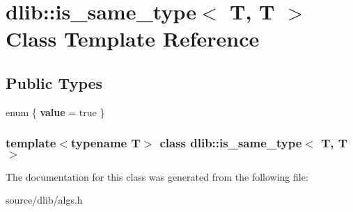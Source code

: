 \hypertarget{classdlib_1_1is__same__type_3_01T_00_01T_01_4}{
\section{dlib::is\_\-same\_\-type$<$ T, T $>$ Class Template Reference}
\label{classdlib_1_1is__same__type_3_01T_00_01T_01_4}
}
\subsection*{Public Types}
\begin{DoxyCompactItemize}
\item 
enum \{ {\bfseries value} =  true
 \}
\end{DoxyCompactItemize}
\subsubsection*{template$<$typename T$>$ class dlib::is\_\-same\_\-type$<$ T, T $>$}



The documentation for this class was generated from the following file:\begin{DoxyCompactItemize}
\item 
source/dlib/algs.h\end{DoxyCompactItemize}

